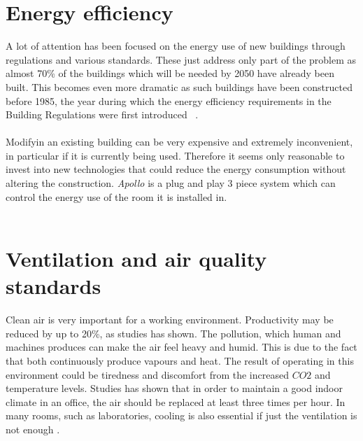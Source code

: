 \documentclass[12pt,a4paper]{report}
\begin{document}
\section{Energy efficiency}
A lot of attention has been focused on the energy use of new buildings through regulations and various standards. These just address only part of the problem as almost 70\% of the buildings which will be needed by 2050 have already been built. This becomes even more dramatic as such buildings have been constructed before 1985, the year during which the energy efficiency requirements in the Building Regulations were first introduced ~\cite{website:building_reg,website:carbon_trust}.
\ \\
\ \\
Modifyin an existing building can be very expensive and extremely inconvenient, in particular if it is currently being used. Therefore it seems only reasonable to invest into new technologies that could reduce the energy consumption without altering the construction. \emph{Apollo} is a plug and play 3 piece system which can control the energy use of the room it is installed in.\\
\ \\
%
\section {Ventilation and air quality standards}
Clean air is very important for a working environment. Productivity may be reduced by up to 20\%, as studies has shown. The pollution, which human and machines produces can make the air feel heavy and humid. This is due to the fact that both continuously produce vapours and heat. The result of operating in this environment could be tiredness and discomfort from the increased $CO2$ and temperature levels. Studies has shown that in order to maintain a good indoor climate in an office, the air should be replaced at least three times per hour. In many rooms, such as laboratories, cooling is also essential if just the ventilation is not enough \cite{website:ventilation}.
%
\end{document}

